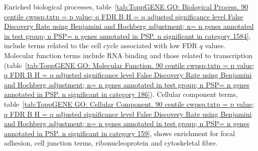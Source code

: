 Enriched biological processes, table~\ref{tab:ToppGENE GO: Biological Process. 90 centile cwpsp.txtp = p value; q FDR B H = q adjusted significance level False Discovery Rate using Benjamini and Hochberg adjustment; n= n genes annotated in test group; n PSP= n genes annotated in PSP. n significant in category 1584}, include terms related to the cell cycle associated with low FDR $q$ values. Molecular function terms include RNA binding and those related to transcription (table~\ref{tab:ToppGENE GO: Molecular Function. 90 centile cwpsp.txtp = p value; q FDR B H = q adjusted significance level False Discovery Rate using Benjamini and Hochberg adjustment; n= n genes annotated in test group; n PSP= n genes annotated in PSP. n significant in category 186}). Cellular component terms, table~\ref{tab:ToppGENE GO: Cellular Component. 90 centile cwpsp.txtp = p value; q FDR B H = q adjusted significance level False Discovery Rate using Benjamini and Hochberg adjustment; n= n genes annotated in test group; n PSP= n genes annotated in PSP. n significant in category 159}, shows enrichment for focal adhesion, cell junction terms, ribonucleoprotein and cytoskeletal fibre. 



